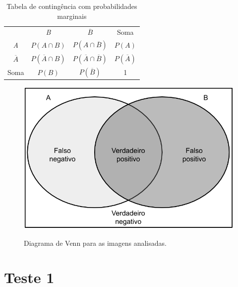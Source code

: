 \begin{table}[htbp]
    \caption{Tabela de contingência com probabilidades marginais}
    \label{tab:tabela_contingencia_probab}
    \centering
    \begin{tabular}{cccc}\hline\hline
        & \textit{B} & $\overline{B}$ & Soma\\
    \textit{A} & $P(A \cap B)$ & $P(A \cap \overline{B})$ & $P(A)$ \\
    $\overline{A}$ & $P(\overline{A} \cap B)$ & $P(\overline{A} \cap \overline{B})$ & $P(\overline{A})$ \\
    Soma & $P(B)$ & $P(\overline{B})$ & 1 \\
    \hline\hline
    \end{tabular}
\end{table}

 \begin{figure}[htbp]
     \centering
     \caption{Diagrama de Venn para as imagens analisadas.}
     \includegraphics[scale=.4]{figs/venn-diagram.png}
     \label{fig:venn_diagram}
  \end{figure}

\section{Teste 1}

